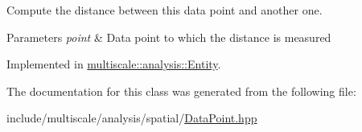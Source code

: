 Compute the distance between this data point and another one. 


\begin{DoxyParams}{Parameters}
{\em point} & Data point to which the distance is measured \\
\hline
\end{DoxyParams}


Implemented in \hyperlink{classmultiscale_1_1analysis_1_1Entity_a39cb4bb856c295c82676085d976d58e8}{multiscale\-::analysis\-::\-Entity}.



The documentation for this class was generated from the following file\-:\begin{DoxyCompactItemize}
\item 
include/multiscale/analysis/spatial/\hyperlink{DataPoint_8hpp}{Data\-Point.\-hpp}\end{DoxyCompactItemize}
